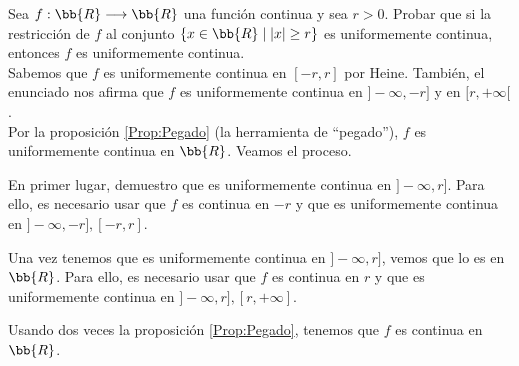 \begin{ejercicio}
    Sea $f:\bb{R}\longrightarrow \bb{R}$ una función continua y sea $r > 0$. Probar que si la restricción de $f$ al conjunto $\{x \in \bb{R} \mid |x|\geq r\}$ es uniformemente continua, entonces $f$ es uniformemente continua.\\

    Sabemos que $f$ es uniformemente continua en $[-r, r]$ por Heine. También, el enunciado nos afirma que $f$ es uniformemente continua en $]-\infty, -r]$ y en $[r, +\infty[$.\\

    Por la proposición \ref{Prop:Pegado} (la herramienta de ``pegado''), $f$ es uniformemente continua en $\bb{R}$. Veamos el proceso.

    En primer lugar, demuestro que es uniformemente continua en $]-\infty, r]$. Para ello, es necesario usar que $f$ es continua en $-r$ y que es uniformemente continua en $]-\infty,-r],[-r,r]$.

    Una vez tenemos que es uniformemente continua en $]-\infty, r]$, vemos que lo es en $\bb{R}$. Para ello, es necesario usar que $f$ es continua en $r$ y que es uniformemente continua en $]-\infty,r],[r,+\infty]$.

    Usando dos veces la proposición \ref{Prop:Pegado}, tenemos que $f$ es continua en $\bb{R}$.
    \begin{comment}
    Dado $\varepsilon > 0$:
    \begin{itemize}
        \item Por la continuidad uniforme en $]-\infty,r]$ dada por el enunciado,
        $$\exists \delta_1 \mid \text{ si }|x-y| < \delta_1 \text{ con } x,y \leq r \Longrightarrow |f(x) - f(y)| < \varepsilon$$
        \item Por la continuidad uniforme en $[-r,r]$ dada por Heine:
        $$\exists \delta_2 \mid \text{ si }|x-y| < \delta_1\text{ con }x,y \in [-r, r] \Longrightarrow |f(x) - f(y)| < \varepsilon$$
        \item Por la continuidad uniforme en $[r,+\infty[$ dada por el enunciado, $$\exists \delta_3 \mid \text{ si }|x-y| < \delta_1 \text{ con } x,y \geq r \Longrightarrow |f(x) - f(y)| < \varepsilon$$
        \item Por la continuidad en $r$:\\
        $$\exists \delta_4 \mid \text{ si }|x-r| < \delta_4 \Longrightarrow |f(x) - f(r)| < \frac{\varepsilon}{2}$$
        \item Por la continuidad en $-r$:\\
        $$\exists \delta_5 \mid \text{ si }|x-(-r)|=|x+r| < \delta_5 \Longrightarrow |f(x) - f(-r)| < \frac{\varepsilon}{2}$$
    \end{itemize}
    \end{comment}
\end{ejercicio}

